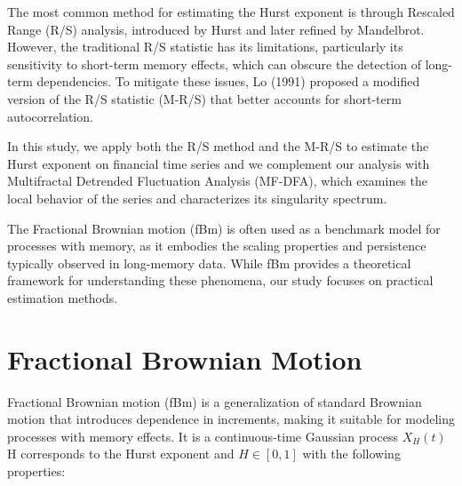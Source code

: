 \documentclass[11pt]{extarticle}
\begin{document}
The most common method for estimating the Hurst exponent is through Rescaled Range (R/S) analysis, introduced by Hurst and later refined by Mandelbrot. However, the traditional R/S statistic has its limitations, particularly its sensitivity to short-term memory effects, which can obscure the detection of long-term dependencies. To mitigate these issues, Lo (1991) proposed a modified version of the R/S statistic (M-R/S) that better accounts for short-term autocorrelation.

In this study, we apply both the R/S method and the M-R/S to estimate the Hurst exponent on financial time series and we complement our analysis with Multifractal Detrended Fluctuation Analysis (MF-DFA), which examines the local behavior of the series and characterizes its singularity spectrum.

The Fractional Brownian motion (fBm) is often used as a benchmark model for processes with memory, as it embodies the scaling properties and persistence typically observed in long-memory data. While fBm provides a theoretical framework for understanding these phenomena, our study focuses on practical estimation methods.

\section{Fractional Brownian Motion}

Fractional Brownian motion (fBm) is a generalization of standard Brownian motion that introduces dependence in increments,
making it suitable for modeling processes with memory effects. It is a continuous-time Gaussian process \( X_H(t) \) H corresponds
to the Hurst exponent and \( H \in [0, 1] \) with the following properties:
\end{document}
